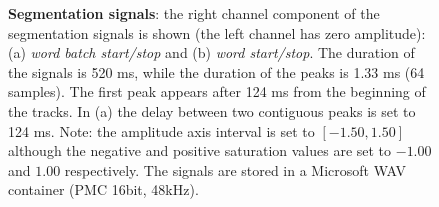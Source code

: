\begin{figure}
	\centering
	
	
	\caption[Segmentation signals]{\textbf{Segmentation signals}:
	the right channel component of the segmentation signals is shown (the left 
	channel has zero amplitude):
	(a) \emph{word batch start/stop} and (b) \emph{word start/stop}.
	The duration of the signals is 520 ms, while the duration of
	the peaks is 1.33 ms (64 samples). The first peak appears after 124 ms from
	the beginning of the tracks.
	In (a) the delay between two contiguous peaks is set to 124 ms. 
	Note: the amplitude axis interval is set to $[-1.50, 1.50]$ although
	the negative and positive saturation values are set to $-1.00$ and $1.00$
	respectively.
	The signals are stored in a Microsoft WAV container (PMC 16bit, 48kHz).
	}
	\label{fig:linguometer:architecture:sig:segmentation}
\end{figure}
